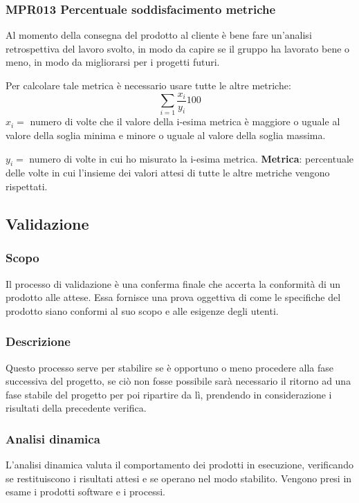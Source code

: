         \subsubsection{MPR013 Percentuale soddisfacimento metriche}\label{percentualeSoddisfacimentoMetriche}
        Al momento della consegna del prodotto al cliente è bene fare un'analisi retrospettiva del lavoro svolto, in modo da capire se il gruppo ha lavorato bene o meno, in modo da migliorarsi per i progetti futuri. \par
        Per calcolare tale metrica è necessario usare tutte le altre metriche:
        \[{\sum_{i=1} \frac{x_i}{y_i}}100\] $x_i=$ numero di volte che il valore della i-esima metrica è maggiore o uguale al valore della soglia minima e minore o uguale al valore della soglia massima. \par
        $y_i=$ numero di volte in cui ho misurato la i-esima metrica.
        \textbf{Metrica}: percentuale delle volte in cui l'insieme dei valori attesi di tutte le altre metriche vengono rispettati.

    \subsection{Validazione}\label{Validazione}
    	
    	\subsubsection{Scopo}
    	Il processo di validazione è una conferma finale che accerta la conformità di un prodotto alle
    	attese. Essa fornisce una prova oggettiva di come le specifiche del prodotto siano conformi al suo
    	scopo e alle esigenze degli utenti.
    
    	\subsubsection{Descrizione}
    	Questo processo serve per stabilire se è opportuno o meno procedere alla fase successiva del progetto, se ciò non fosse possibile sarà necessario il ritorno ad una fase stabile del progetto
    	per poi ripartire da lì, prendendo in considerazione i risultati della precedente verifica.
    
	    \subsubsection{Analisi dinamica}\label{validazione:AnalisiDinamica}
	    L'analisi dinamica valuta il comportamento dei prodotti in esecuzione, verificando se restituiscono i risultati attesi e se operano nel modo stabilito.
	    Vengono presi in esame i prodotti software e i processi.
	    
